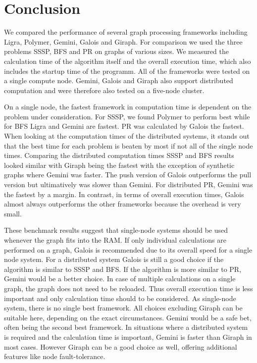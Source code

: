 
\section{Conclusion}

We compared the performance of several graph processing frameworks including Ligra, Polymer, Gemini, Galois and Giraph. 
For comparison we used the three problems SSSP, BFS and PR on graphs of various sizes.
We measured the calculation time of the algorithm itself and the overall execution time, which also includes the startup time of the programm.
All of the frameworks were tested on a single compute node. Gemini, Galois and Giraph also support distributed computation and were therefore also tested on a five-node cluster.

On a single node, the fastest framework in computation time is dependent on the problem under consideration.
For SSSP, we found Polymer to perform best while for BFS Ligra and Gemini are fastest. PR was calculated by Galois the fastest.
When looking at the computation times of the distributed systems, it stands out that the best time for each problem is beaten by most if not all of the single node times.
Comparing the distributed computation times SSSP and BFS results looked similar with Giraph being the fastest with the exception of synthetic graphs where Gemini was faster. The push version of Galois outperforms the pull version but ultimatively was slower than Gemini. For distributed PR, Gemini was the fastest by a margin.
In contrast, in terms of overall execution times, Galois almost always outperforms the other frameworks because the overhead is very small.

These benchmark results suggest that single-node systems should be used whenever the graph fits into the RAM. 
If only individual calculations are performed on a graph, Galois is recommended due to its overall speed for a single node system. 
For a distributed system Galois is still a good choice if the algorithm is similar to SSSP and BFS. If the algorithm is more similar to PR, Gemini would be a better choice.
In case of multiple calculations on a single graph, the graph does not need to be reloaded. Thus overall execution time is less important and only calculation time should to be considered.
As single-node system, there is no single best framework. All choices excluding Giraph can be suitable here, depending on the exact circumstances. Gemini would be a safe bet, often being the second best framework. 
In situations where a distributed system is required and the calculation time is important, Gemini is faster than Giraph in most cases.
However Giraph can be a good choice as well, offering additional features like node fault-tolerance.



